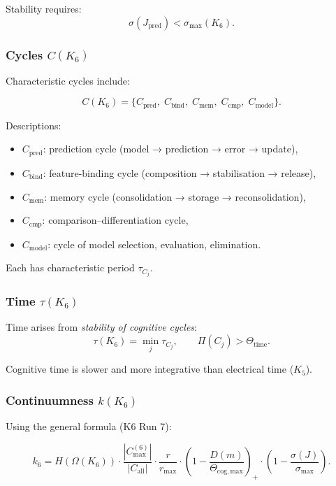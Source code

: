 Stability requires:
\[
\sigma(J_{\mathrm{pred}}) < \sigma_{\max}(K_6).
\]

\subsubsection{Cycles \texorpdfstring{$C(K_6)$}{C(K_6)}}

Characteristic cycles include:

\[
C(K_6) =
\{
C_{\mathrm{pred}},\;
C_{\mathrm{bind}},\;
C_{\mathrm{mem}},\;
C_{\mathrm{cmp}},\;
C_{\mathrm{model}}
\}.
\]

Descriptions:
\begin{itemize}
    \item $C_{\mathrm{pred}}$: prediction cycle (model → prediction → error → update),
    \item $C_{\mathrm{bind}}$: feature-binding cycle (composition → stabilisation → release),
    \item $C_{\mathrm{mem}}$: memory cycle (consolidation → storage → reconsolidation),
    \item $C_{\mathrm{cmp}}$: comparison–differentiation cycle,
    \item $C_{\mathrm{model}}$: cycle of model selection, evaluation, elimination.
\end{itemize}

Each has characteristic period $\tau_{C_j}$.

\subsubsection{Time \texorpdfstring{$\tau(K_6)$}{\tau(K_6)}}

Time arises from \emph{stability of cognitive cycles}:
\[
\tau(K_6)
= \min_j \tau_{C_j},
\qquad
\Pi(C_j) > \Theta_{\mathrm{time}}.
\]

Cognitive time is slower and more integrative than electrical time ($K_5$).

\subsubsection{Continuumness \texorpdfstring{$k(K_6)$}{k(K_6)}}

Using the general formula (K6 Run 7):

\[
k_6
= H(\Omega(K_6))
  \cdot \frac{|C_{\max}^{(6)}|}{|C_{\mathrm{all}}|}
  \cdot \frac{r}{r_{\max}}
  \cdot \left(1 - \frac{D(m)}{\Theta_{\mathrm{cog,max}}}\right)_+
  \cdot \left(1-\frac{\sigma(J)}{\sigma_{\max}}\right).
\]


